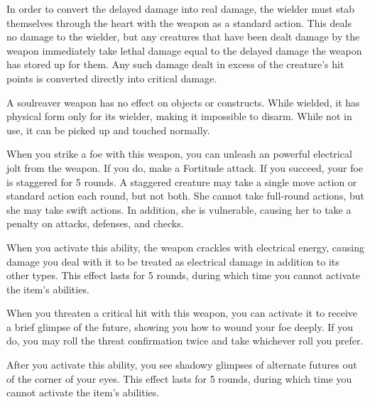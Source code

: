 In order to convert the delayed damage into real damage, the wielder must stab themselves through the heart with the weapon as a standard action.
This deals no damage to the wielder, but any creatures that have been dealt damage by the weapon immediately take lethal damage equal to the delayed damage the weapon has stored up for them.
Any such damage dealt in excess of the creature's hit points is converted directly into critical damage.

A soulreaver weapon has no effect on objects or constructs.
While wielded, it has physical form only for its wielder, making it impossible to disarm.
While not in use, it can be picked up and touched normally.


 When you strike a foe with this weapon, you can unleash an powerful electrical jolt from the weapon.
If you do, make a Fortitude attack.
If you succeed, your foe is staggered for 5 rounds.
A staggered creature may take a single move action or standard action each round, but not both.
She cannot take full-round actions, but she may take swift actions.
In addition, she is vulnerable, causing her to take a  penalty on attacks, defenses, and checks.

When you activate this ability, the weapon crackles with electrical energy, causing damage you deal with it to be treated as electrical damage in addition to its other types.
This effect lasts for 5 rounds, during which time you cannot activate the item's abilities.


 When you threaten a critical hit with this weapon, you can activate it to receive a brief glimpse of the future, showing you how to wound your foe deeply.
If you do, you may roll the threat confirmation twice and take whichever roll you prefer.

After you activate this ability, you see shadowy glimpses of alternate futures out of the corner of your eyes.
This effect lasts for 5 rounds, during which time you cannot activate the item's abilities.


